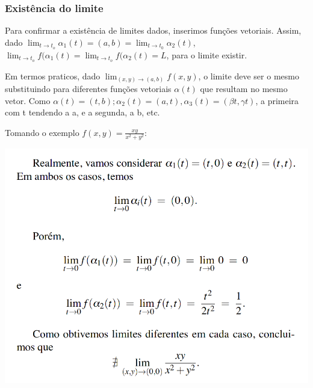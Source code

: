 \documentclass[letterpaper, 11pt]{article}
\begin{document}

\subsubsection{Existência do limite}
\label{sec:orga70c7c8}
Para confirmar a existência de limites dados, inserimos funções vetoriais. Assim, dado \(\lim_{t \to t_o} \alpha_1(t) = (a,b) = \lim_{t \to t_0} \alpha_2(t)\), \(\lim_{t \to t_o} f(\alpha_1(t) = \lim_{t \to t_o} f(\alpha_2(t) = L\),
para o limite existir.

Em termos praticos, dado \(\lim_{(x,y) \to (a,b)} f(x,y)\), o limite deve ser o mesmo substituindo para diferentes funções vetoriais \(\alpha(t)\) que resultam no mesmo vetor. Como \(\alpha(t) = (t,b); \alpha_2(t) = (a,t), \alpha_3(t) = (\beta t, \gamma t)\), a primeira com t tendendo a a, e a segunda, a b, etc.

Tomando o exemplo \(f(x,y) = \frac{xy}{x^2+y^2}\):

\begin{center}
\includegraphics[width=.9\linewidth]{./img/exlim.png}
\end{center}
\end{document}
